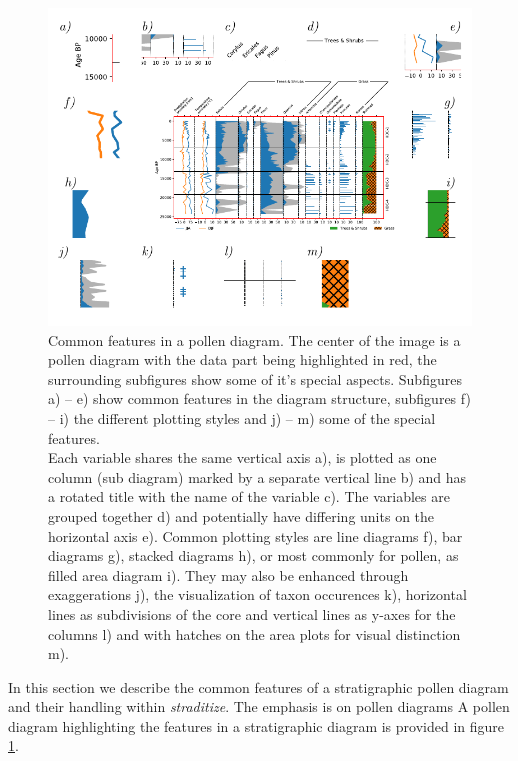 \documentclass[
11pt, %
english, %
singlespacing, %
headsepline, %
]{MastersDoctoralThesis} %
\begin{document}
\begin{NoHyper}
\begin{refsection}
\begin{figure}
	\includegraphics[width=\linewidth]{straditize-figures/sample-diagram-explained.pdf}
	\caption[Common features in a pollen diagram]{Common features in a pollen diagram. The center of the image is a pollen diagram with the data part being highlighted in red, the surrounding subfigures show some of it’s special aspects.
		Subfigures a) – e) show common features in the diagram structure, subfigures f) – i) the different plotting styles and j) – m) some of the special features. \\
		Each variable shares the same vertical axis a), is plotted as one column (sub diagram) marked by a separate vertical line b) and has a rotated title with the name of the variable c). The variables are grouped together d) and potentially have differing units on the horizontal axis  e). Common plotting styles are line diagrams f), bar diagrams g), stacked diagrams h), or  most commonly for pollen, as filled area diagram i). They may also be enhanced through exaggerations j), the visualization of taxon occurences k), horizontal lines as subdivisions of the core and vertical lines as y-axes for the columns l)  and with hatches on the area plots     for visual distinction m).
	}
	\label{fig:sample-diagram}
\end{figure}

In this section we describe the common features of a stratigraphic pollen diagram and their handling within \emph{straditize}. The emphasis is on pollen diagrams
A pollen diagram highlighting the features in a stratigraphic diagram is provided in figure
\ref{fig:sample-diagram}.


\end{refsection}
\end{NoHyper}
\end{document}
